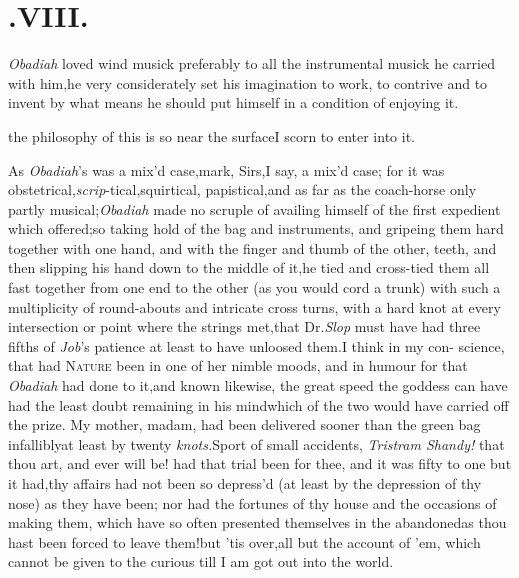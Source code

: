 \documentclass{article}
\begin{document}
\null
\section{.\quad  VIII.}

 \textit{Obadiah} loved wind musick pre\-ferably to all the instrumental
mu\-sick he carried with him,\tsk he very considerately set his imagination to work, to
contrive and to invent by what means he should put himself in a condition of
enjoying it.

\tsh the philosophy of this is so near the
surface\tsk I scorn to enter into it.

As \textit{Obadiah}’s was a mix’d case,\tsh mark,
Sirs,\tsh I say, a mix’d case; for it was
obstetrical,\tsk \textit{scrip}-tical,\tsk squirtical,
papistical,\tsk and as far as the coach-horse
 only partly
musical;\tsk \textit{Obadiah} made no scruple of availing himself
of the first expedient which offered;\tsk so taking hold of the bag and
instruments, and gripeing them hard together with one hand, and with the finger and thumb
of the other,  teeth, and
then slipping his hand down to the middle of it,\tsk he tied and
cross-tied them all fast together from one end to the other (as you
would cord a trunk) with such a multiplicity of round-abouts and
intricate cross turns, with a hard knot at every intersection or
point where the strings met,\tsk that Dr.\@ \textit{Slop} must have
had three fifths of \textit{Job}’s patience at least to have
unloosed them.\tsk I think in my
con-\break
science, that had \textsc{Nature} been in one of
her nimble moods, and in humour for
 that \textit{Obadiah} had done to
it,\tsk and known likewise, the great speed the goddess can
 have had the least doubt
remaining in his mind\tsk which of the two would have carried off
the prize. My mother, madam, had been delivered sooner than the
green bag infallibly\tsh at least by twenty \textit{knots.}\tsh Sport
of small accidents, \textit{Trist\-ram Shandy!} that thou art, and ever
will be! had that trial been for thee, and it was fifty to one but
it had,\tsh thy affairs had not been so
depress’d\tsk
(at least by the depression of thy nose) as
they have been; nor had the fortunes of thy house and the occasions
of making them, which have so often presented themselves in
the
abandoned\tsk as thou hast been forced
to leave them!\tsk but ’tis over,\tsk all
but the account of ’em, which cannot be given to the curious
till I am got out into the world.
\end{document}
